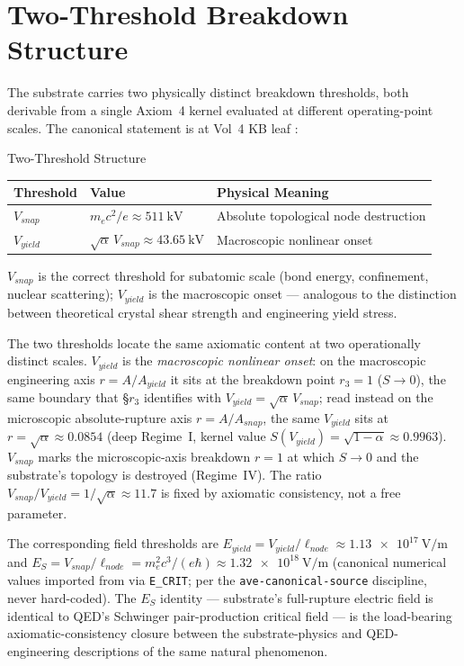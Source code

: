 \section{Two-Threshold Breakdown Structure}
\label{sec:vol9_two_threshold}

The substrate carries two physically distinct breakdown thresholds, both derivable from a single Axiom~4 kernel evaluated at different operating-point scales. The canonical statement is at Vol~4 KB leaf :

\begin{resultbox}{Two-Threshold Structure}
\begin{tabular}{lll}
\toprule
\textbf{Threshold} & \textbf{Value} & \textbf{Physical Meaning} \\
\midrule
$V_{snap}$  & $m_e c^2 / e \approx \qty{511}{\kilo\volt}$        & Absolute topological node destruction \\
$V_{yield}$ & $\sqrt{\alpha}\, V_{snap} \approx \qty{43.65}{\kilo\volt}$ & Macroscopic nonlinear onset \\
\bottomrule
\end{tabular}

\medskip
$V_{snap}$ is the correct threshold for subatomic scale (bond energy, confinement, nuclear scattering); $V_{yield}$ is the macroscopic onset --- analogous to the distinction between theoretical crystal shear strength and engineering yield stress.
\end{resultbox}

The two thresholds locate the same axiomatic content at two operationally distinct scales. $V_{yield}$ is the \emph{macroscopic nonlinear onset}: on the macroscopic engineering axis $r = A/A_{yield}$ it sits at the breakdown point $r_3 = 1$ ($S \to 0$), the same boundary that  \S$r_3$ identifies with $V_{yield} = \sqrt{\alpha}\,V_{snap}$; read instead on the microscopic absolute-rupture axis $r = A/A_{snap}$, the same $V_{yield}$ sits at $r = \sqrt{\alpha} \approx 0.0854$ (deep Regime~I, kernel value $S(V_{yield}) = \sqrt{1-\alpha} \approx 0.9963$). $V_{snap}$ marks the microscopic-axis breakdown $r = 1$ at which $S \to 0$ and the substrate's topology is destroyed (Regime~IV). The ratio $V_{snap}/V_{yield} = 1/\sqrt{\alpha} \approx 11.7$ is fixed by axiomatic consistency, not a free parameter.

The corresponding field thresholds are $E_{yield} = V_{yield}/\ell_{node} \approx \qty{1.13e17}{\volt\per\metre}$ and $E_S = V_{snap}/\ell_{node} = m_e^2 c^3/(e\hbar) \approx \qty{1.32e18}{\volt\per\metre}$ (canonical numerical values imported from  via \texttt{E\_CRIT}; per the \texttt{ave-canonical-source} discipline, never hard-coded). The $E_S$ identity --- substrate's full-rupture electric field is identical to QED's Schwinger pair-production critical field --- is the load-bearing axiomatic-consistency closure between the substrate-physics and QED-engineering descriptions of the same natural phenomenon.

